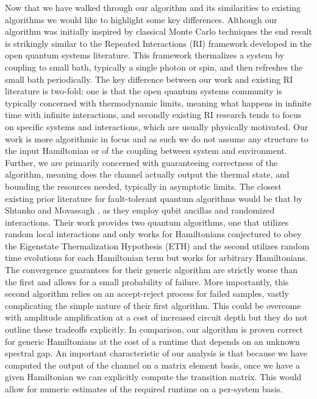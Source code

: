 \documentclass{article}
\begin{document}
Now that we have walked through our algorithm and its similarities to existing algorithms we would like to highlight some key differences. Although our algorithm was initially inspired by classical Monte Carlo techniques the end result is strikingly similar to the Repeated Interactions (RI) framework developed in the open quantum systems literature. This framework thermalizes a system by coupling to small bath, typically a single photon or spin, and then refreshes the small bath periodically. The key difference between our work and existing RI literature is two-fold: one is that the open quantum systems community is typically concerned with thermodynamic limits, meaning what happens in infinite time with infinite interactions, and secondly existing RI research tends to focus on specific systems and interactions, which are usually physically motivated. Our work is more algorithmic in focus and as such we do not assume any structure to the input Hamiltonian or of the coupling between system and environment. Further, we are primarily concerned with guaranteeing correctness of the algorithm, meaning does the channel actually output the thermal state, and bounding the resources needed, typically in asymptotic limits. The closest existing prior literature for fault-tolerant quantum algorithms would be that by Shtanko and Movassagh \cite{shtanko2023preparingthermalstatesnoiseless}, as they employ qubit ancillas and randomized interactions. Their work provides two quantum algorithms, one that utilizes random local interactions and only works for Hamiltonians conjectured to obey the Eigenstate Thermalization Hypothesis (ETH) and the second utilizes random time evolutions for each Hamiltonian term but works for arbitrary Hamiltonians. The convergence guarantees for their generic algorithm are strictly worse than the first and allows for a small probability of failure. More importantly, this second algorithm relies on an accept-reject process for failed samples, vastly complicating the simple nature of their first algorithm. This could be overcome with amplitude amplification at a cost of increased circuit depth but they do not outline these tradeoffs explicitly. In comparison, our algorithm is proven correct for generic Hamiltonians at the cost of a runtime that depends on an unknown spectral gap. An important characteristic of our analysis is that because we have computed the output of the channel on a matrix element basis, once we have a given Hamiltonian we can explicitly compute the transition matrix. This would allow for numeric estimates of the required runtime on a per-system basis. 
\end{document}
